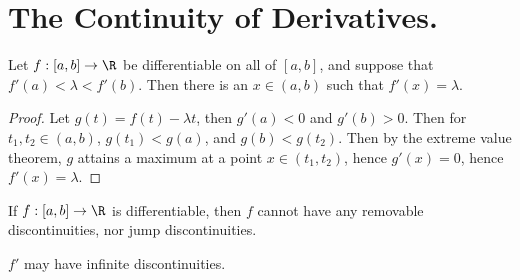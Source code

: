 
\section{The Continuity of Derivatives.}

\begin{theorem}\label{6.3.1}
    Let $f:[a,b] \rightarrow \R$ be differentiable on all of  $[a,b]$, and suppose that 
    $f'(a)<\lambda<f'(b)$. Then there is an  $x \in (a,b)$ such that $f'(x)=\lambda$.
\end{theorem}
\begin{proof}
    Let $g(t)=f(t)-\lambda t$, then  $g'(a)<0$ and  $g'(b)>0$. Then for  $t_1,t_2 \in (a,b)$, 
    $g(t_1)<g(a)$, and $g(b)<g(t_2)$. Then by the extreme value theorem, $g$ attains a maximum at 
    a point  $x \in (t_1,t_2)$, hence $g'(x)=0$, hence  $f'(x)=\lambda$.
\end{proof}

\begin{corollary}
    If $f:[a,b] \rightarrow \R$ is differentiable, then  $f$ cannot have any removable discontinuities, 
    nor jump discontinuities.
\end{corollary}

\begin{remark}
    $f'$ may have infinite discontinuities.
\end{remark}
